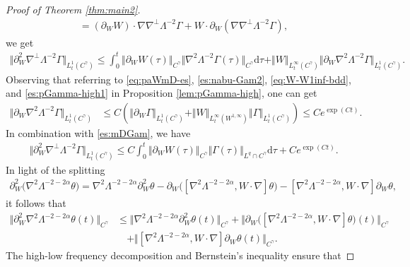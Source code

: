\documentclass[reqno,11pt,a4paper]{amsart}
\newcommand{\dd}{\mathrm{d}}
\def \p {\partial}
\begin{document}
\begin{proof}[Proof of Theorem \ref{thm:main2}]
\begin{align*}
  = (\partial_W W) \cdot \nabla\nabla^{\perp} \Lambda^{-2} \Gamma 
  + W\cdot\partial_W(\nabla \nabla^{\perp} \Lambda^{-2} \Gamma),
\end{align*}
we get
\begin{align*}
  \Vert \partial_W^2  \nabla^{\perp} \Lambda^{-2} \Gamma\Vert _{L^1_t(C^\gamma)}
  \leq \int_0^t\Vert \partial_W W (\tau)\Vert _{C^\gamma}\Vert \nabla^2 \Lambda^{-2} \Gamma(\tau)\Vert _{C^\gamma} \dd \tau
  + \Vert W\Vert _{L^\infty_t(C^\gamma)} \Vert \partial_W\nabla^2\Lambda^{-2} \Gamma\Vert _{L^1_t(C^\gamma)}.
\end{align*}
Observing that referring to \eqref{eq:paWmD-es}, \eqref{es:nabu-Gam2}, \eqref{eq:W-W1inf-bdd}, 
and \eqref{es:pGamma-high1} in Proposition \ref{lem:pGamma-high}, one can get
\begin{align*}
  \Vert \partial_W\nabla^2 \Lambda^{-2} \Gamma\Vert _{L^1_t(C^\gamma)} 
  & \leq C\left( \left\Vert  \p_W \Gamma\right\Vert _{L^1_t(C^\gamma)} + \Vert W\Vert _{L^\infty_t(W^{1,\infty})} 
  \left\Vert \Gamma\right\Vert _{L^1_t(C^\gamma)} \right) \leq C e^{\exp(Ct)}.
\end{align*}
In combination with \eqref{es:mDGam}, we have 
\begin{align}\label{eq:parW2-Gam}
  \Vert \partial_W^2  \nabla^{\perp} \Lambda^{-2} \Gamma\Vert _{L^1_t(C^\gamma)}
  \leq C \int_0^t \Vert \partial_W W(\tau) \Vert _{C^\gamma} \Vert \Gamma(\tau)\Vert _{L^q\cap C^\gamma} \dd \tau
  + C e^{\exp(Ct)}.
\end{align}
In light of the splitting
\begin{equation*}
\begin{split}
  \p_W^2\big(\nabla^2\Lambda^{-2-2\alpha} \theta \big) 
  = \nabla^2\Lambda^{-2-2\alpha} \p_W^2\theta
  -\p_W\big([\nabla^2\Lambda^{-2-2\alpha}, W\cdot\nabla]\theta\big)
  - [\nabla^2\Lambda^{-2-2\alpha}, W\cdot\nabla]\p_W\theta,
\end{split}
\end{equation*} 
it follows that 
\begin{align*}
  \big\Vert \partial^2_W \nabla^2 \Lambda^{-2-2\alpha} \theta(t) \big\Vert _{C^\gamma} 
  & \leq \Vert \nabla^2\Lambda^{-2-2\alpha} \p_W^2\theta(t)\Vert _{C^\gamma} 
  + \big\Vert \p_W\big([\nabla^2 \Lambda^{-2-2\alpha}, W\cdot\nabla]\theta\big)(t)\big\Vert _{C^\gamma}\\
  & \quad + \Vert [\nabla^2 \Lambda^{-2-2\alpha}, W\cdot\nabla]\p_W\theta (t)\Vert _{C^\gamma}.
\end{align*}
The high-low frequency decomposition and Bernstein's inequality ensure that

\end{proof}
\end{document}
